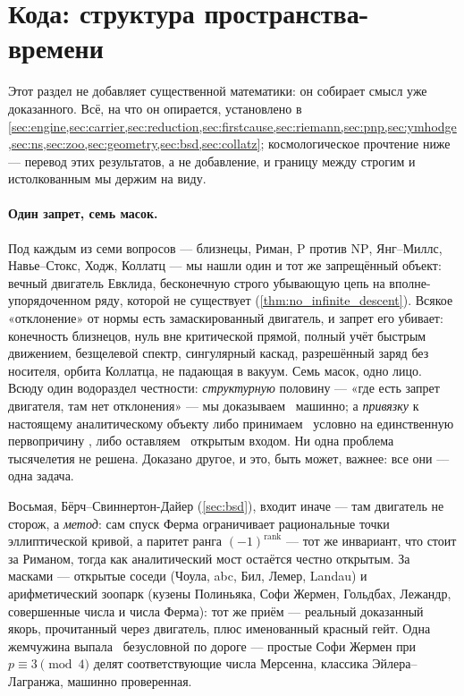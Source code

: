 \section{Кода: структура пространства-времени}\label{sec:coda}

Этот раздел не добавляет существенной математики: он собирает смысл уже доказанного. Всё, на что он
опирается, установлено в \cref{sec:engine,sec:carrier,sec:reduction,sec:firstcause,sec:riemann,sec:pnp,sec:ymhodge,sec:ns,sec:zoo,sec:geometry,sec:bsd,sec:collatz}; космологическое прочтение ниже —
перевод этих результатов, а не добавление, и границу между строгим и истолкованным мы держим на виду.

\paragraph{Один запрет, семь масок.}
Под каждым из семи вопросов — близнецы, Риман, $\mathrm{P}$ против $\mathrm{NP}$, Янг--Миллс,
Навье--Стокс, Ходж, Коллатц — мы нашли один и тот же запрещённый объект: вечный двигатель Евклида,
бесконечную строго убывающую цепь на вполне-упорядоченном ряду, которой не существует
(\cref{thm:no_infinite_descent}). Всякое «отклонение» от нормы есть замаскированный двигатель, и
запрет его убивает: конечность близнецов, нуль вне критической прямой, полный учёт быстрым движением,
безщелевой спектр, сингулярный каскад, разрешённый заряд без носителя, орбита Коллатца, не падающая в
вакуум. Семь масок, одно лицо. Всюду один водораздел честности: \emph{структурную} половину — «где
есть запрет двигателя, там нет отклонения» — мы доказываем \green{}~машинно; а \emph{привязку} к
настоящему аналитическому объекту либо принимаем \yellow{}~условно на единственную первопричину
\axiom{}, либо оставляем \red{}~открытым входом. Ни одна проблема тысячелетия не решена. Доказано
другое, и это, быть может, важнее: все они — одна задача.

Восьмая, Бёрч--Свиннертон-Дайер (\cref{sec:bsd}), входит иначе — там двигатель не сторож, а
\emph{метод}: сам спуск Ферма ограничивает рациональные точки эллиптической кривой, а паритет ранга
$(-1)^{\mathrm{rank}}$ — тот же инвариант, что стоит за Риманом, тогда как аналитический мост остаётся
честно открытым. За масками — открытые соседи (Чоула, abc, Бил, Лемер, Landau) и арифметический
зоопарк (кузены Полиньяка, Софи Жермен, Гольдбах, Лежандр, совершенные числа и числа Ферма): тот же
приём — реальный доказанный якорь, прочитанный через двигатель, плюс именованный красный гейт. Одна
жемчужина выпала \green{}~безусловной по дороге — простые Софи Жермен при $p \equiv 3 \pmod 4$ делят
соответствующие числа Мерсенна, классика Эйлера--Лагранжа, машинно проверенная.

